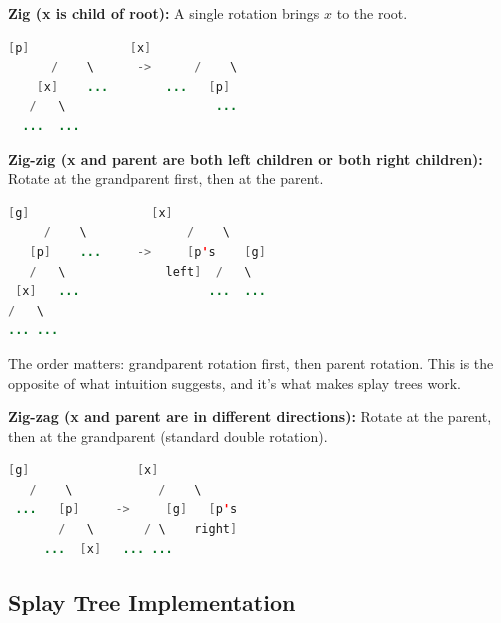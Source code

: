 \textbf{Zig (x is child of root):} A single rotation brings $x$ to the root.

\begin{lstlisting}[language=Java]
       [p]              [x]
      /    \      ->      /    \
    [x]    ...        ...   [p]
   /   \                     ...
  ...  ...

\end{lstlisting}

\textbf{Zig-zig (x and parent are both left children or both right children):} Rotate at the grandparent first, then at the parent.

\begin{lstlisting}[language=Java]
      [g]                 [x]
     /    \              /    \
   [p]    ...     ->     [p's    [g]
   /   \              left]  /   \
 [x]   ...                  ...  ...
/   \
... ...

\end{lstlisting}

The order matters: grandparent rotation first, then parent rotation. This is the opposite of what intuition suggests, and it's what makes splay trees work.

\textbf{Zig-zag (x and parent are in different directions):} Rotate at the parent, then at the grandparent (standard double rotation).

\begin{lstlisting}[language=Java]
    [g]               [x]
   /    \            /    \
 ...   [p]     ->     [g]   [p's
       /   \       / \    right]
     ...  [x]   ... ...

\end{lstlisting}

\subsection{Splay Tree Implementation}


